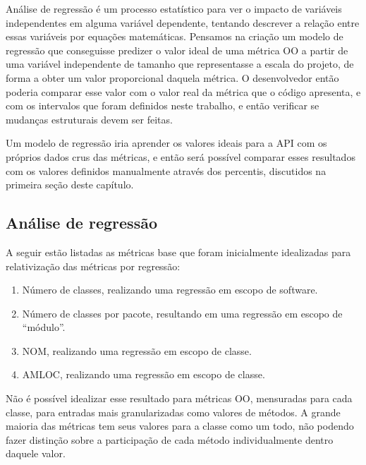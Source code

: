 Análise de regressão é um processo estatístico para ver o impacto de variáveis independentes em alguma variável dependente, tentando descrever a relação entre essas variáveis por equações matemáticas. Pensamos na criação um modelo de regressão que conseguisse predizer o valor ideal de uma métrica OO a partir de uma variável independente de tamanho que representasse a escala do projeto, de forma a obter um valor proporcional daquela métrica. O desenvolvedor então poderia comparar esse valor com o valor real da métrica que o código apresenta, e com os intervalos que foram definidos neste trabalho, e então verificar se mudanças estruturais devem ser feitas.

Um modelo de regressão iria aprender os valores ideais para a API com os próprios dados crus das métricas, e então será possível comparar esses resultados com os valores definidos manualmente através dos percentis, discutidos na primeira seção deste capítulo.



\subsection{Análise de regressão}

A seguir estão listadas as métricas base que foram inicialmente idealizadas para relativização das métricas por regressão:

\begin{enumerate}
\item Número de classes, realizando uma regressão em escopo de software.
\item Número de classes por pacote, resultando em uma regressão em escopo de ``módulo''.
\item NOM, realizando uma regressão em escopo de classe.
\item AMLOC, realizando uma regressão em escopo de classe.
\end{enumerate}

Não é possível idealizar esse resultado para métricas OO, mensuradas para cada classe, para entradas mais granularizadas como valores de métodos. A grande maioria das métricas tem seus valores para a classe como um todo, não podendo fazer distinção sobre a participação de cada método individualmente dentro daquele valor.

